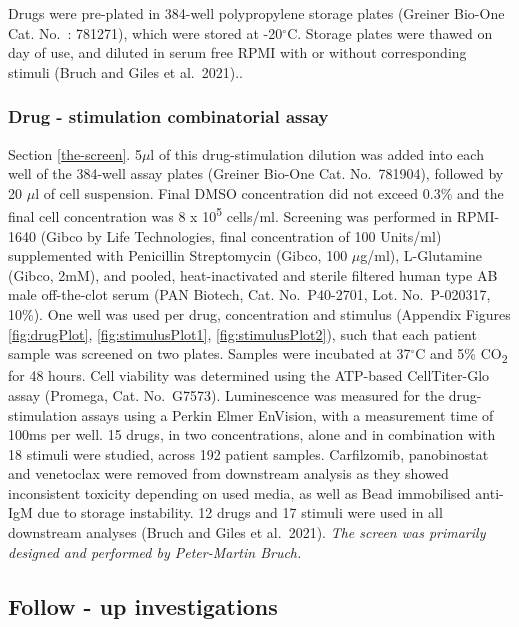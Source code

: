 \documentclass[11pt, a4paper, twosided]{book}
\begin{document}
Drugs were pre-plated in 384-well polypropylene storage plates (Greiner Bio-One Cat. No.~: 781271), which were stored at -20\(^\circ\)C. Storage plates were thawed on day of use, and diluted in serum free RPMI with or without corresponding stimuli (Bruch and Giles et al.~2021)..

\hypertarget{drug---stimulation-combinatorial-assay}{%
\subsubsection{Drug - stimulation combinatorial assay}\label{drug---stimulation-combinatorial-assay}}

Section \ref{the-screen}. 5\(\mu\)l of this drug-stimulation dilution was added into each well of the 384-well assay plates (Greiner Bio-One Cat. No.~781904), followed by 20 \(\mu\)l of cell suspension. Final DMSO concentration did not exceed 0.3\% and the final cell concentration was 8 x 10\textsuperscript{5} cells/ml. Screening was performed in RPMI-1640 (Gibco by Life Technologies, final concentration of 100 Units/ml) supplemented with Penicillin Streptomycin (Gibco, 100 \(\mu\)g/ml), L-Glutamine (Gibco, 2mM), and pooled, heat-inactivated and sterile filtered human type AB male off-the-clot serum (PAN Biotech, Cat. No.~P40-2701, Lot. No.~P-020317, 10\%). One well was used per drug, concentration and stimulus (Appendix Figures \ref{fig:drugPlot}, \ref{fig:stimulusPlot1}, \ref{fig:stimulusPlot2}), such that each patient sample was screened on two plates. Samples were incubated at 37\(^\circ\)C and 5\% CO\textsubscript{2} for 48 hours. Cell viability was determined using the ATP-based CellTiter-Glo assay (Promega, Cat. No.~G7573). Luminescence was measured for the drug-stimulation assays using a Perkin Elmer EnVision, with a measurement time of 100ms per well. 15 drugs, in two concentrations, alone and in combination with 18 stimuli were studied, across 192 patient samples. Carfilzomib, panobinostat and venetoclax were removed from downstream analysis as they showed inconsistent toxicity depending on used media, as well as Bead immobilised anti-IgM due to storage instability. 12 drugs and 17 stimuli were used in all downstream analyses (Bruch and Giles et al.~2021). \emph{The screen was primarily designed and performed by Peter-Martin Bruch. }

\hypertarget{follow---up-investigations}{%
\subsection{Follow - up investigations}\label{follow---up-investigations}}
\end{document}
